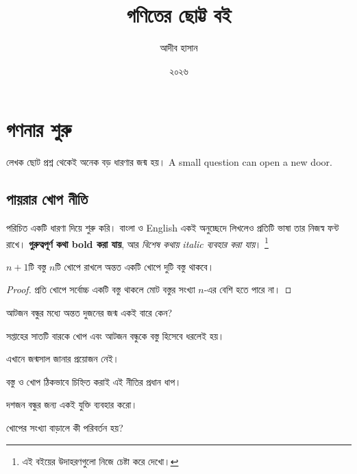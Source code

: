 \documentclass[12pt,twoside]{bookbangla}
\title{গণিতের ছোট্ট বই}
\author{আদীব হাসান}
\date{২০২৬}
\begin{document}
\frontmatter
\begin{titlingpage}
\maketitle
\end{titlingpage}
\tableofcontents*
\mainmatter
\chapter{গণনার শুরু}
\begin{chapquote}{লেখক}
ছোট প্রশ্ন থেকেই অনেক বড় ধারণার জন্ম হয়। A small question can open a new door.
\end{chapquote}
\section{পায়রার খোপ নীতি}\label{sec:pigeonhole}
 পরিচিত একটি ধারণা দিয়ে শুরু করি। বাংলা ও English একই
অনুচ্ছেদে লিখলেও প্রতিটি ভাষা তার নিজস্ব ফন্ট রাখে।
\textbf{গুরুত্বপূর্ণ কথা bold করা যায়}, আর \textit{বিশেষ কথায় italic ব্যবহার করা যায়}।%
\footnote{এই বইয়ের উদাহরণগুলো নিজে চেষ্টা করে দেখো।}

\begin{theorem}[পায়রার খোপ নীতি]
$n+1$টি বস্তু $n$টি খোপে রাখলে অন্তত একটি খোপে দুটি বস্তু থাকবে।
\end{theorem}
\begin{proof}
প্রতি খোপে সর্বোচ্চ একটি বস্তু থাকলে মোট বস্তুর সংখ্যা $n$-এর বেশি হতে পারে না।
\end{proof}
\begin{example}[label=example:weekdays]
আটজন বন্ধুর মধ্যে অন্তত দুজনের জন্ম একই বারে কেন?
\end{example}
\begin{solution}
সপ্তাহের সাতটি বারকে খোপ এবং আটজন বন্ধুকে বস্তু হিসেবে ধরলেই হয়।
\end{solution}
\begin{remark}
এখানে জন্মসাল জানার প্রয়োজন নেই।
\end{remark}
\begin{reminder}
বস্তু ও খোপ ঠিকভাবে চিহ্নিত করাই এই নীতির প্রধান ধাপ।
\end{reminder}
\begin{diybox}
\begin{smartlist}
\item দশজন বন্ধুর জন্য একই যুক্তি ব্যবহার করো।
\item খোপের সংখ্যা বাড়ালে কী পরিবর্তন হয়?
\end{smartlist}
\end{diybox}
\end{document}
